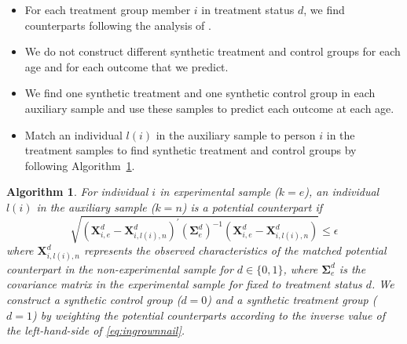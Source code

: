 \documentclass[static]{JJH-Beamer}
\newtheorem{algorithm}{Algorithm}
\begin{document}
\begin{frame}

\begin{itemize}
\item For each treatment group member $i$ in treatment status $d$, we find counterparts following the analysis of \citet{Heckman_Ichimura_etal_1998_REStud}.
\item We do not construct different synthetic treatment and control groups for each age and for each outcome that we predict.
\item We find one synthetic treatment and one synthetic control group in each auxiliary sample and use these samples to predict each outcome at each age.
\item Match an individual $l(i)$ in the auxiliary sample to person $i$ in the treatment samples to find synthetic treatment and control groups by following Algorithm~\ref{alg:match}.\\
\end{itemize}

\end{frame}

\begin{frame}

\begin{algorithm}\label{alg:match}
For individual $i$ in experimental sample ($k=e$), an individual $l(i)$ in the auxiliary sample ($k=n$) is a potential counterpart if
\begin{equation}\label{eq:ingrownnail}
\sqrt{(\bm{X}^d_{i,e} - \bm{X}^d_{i,l(i),n})^\prime (\bm{\Sigma}^d_e)^{-1} (\bm{X}^d_{i,e} - \bm{X}^d_{i,l(i),n})} \leq \epsilon
\end{equation}
where $\bm{X}^d_{i,l(i),n}$ represents the observed characteristics of the matched potential counterpart in the non-experimental sample for $d \in \{0,1\}$, where $\bm{\Sigma}^d_e$ is the covariance matrix in the experimental sample for fixed to treatment status $d$. We construct a synthetic control group ($d = 0$) and a synthetic treatment group ($d = 1$) by weighting the potential counterparts according to the inverse value of the left-hand-side of \eqref{eq:ingrownnail}.
\end{algorithm}

\end{frame}
\end{document}

